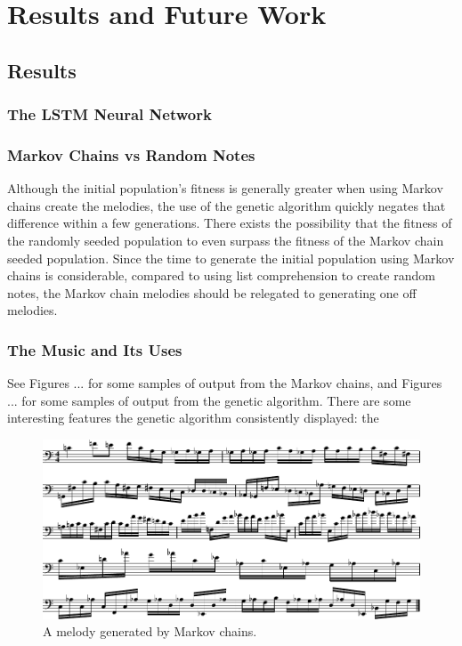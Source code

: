 \chapter{Results and Future Work} \label{results_future}

\section{Results} \label{results}

\subsection{The LSTM Neural Network}


\subsection{Markov Chains vs Random Notes}
Although the initial population's fitness is generally greater when using Markov chains create the melodies, the use of the genetic algorithm quickly negates that difference within a few generations.
There exists the possibility that the fitness of the randomly seeded population to even surpass the fitness of the Markov chain seeded population.
Since the time to generate the initial population using Markov chains is considerable, compared to using list comprehension to create random notes, the Markov chain melodies should be relegated to generating one off melodies.

\subsection{The Music and Its Uses}
See Figures ... for some samples of output from the Markov chains, and Figures ... for some samples of output from the genetic algorithm.
There are some interesting features the genetic algorithm consistently displayed: the 

\begin{figure}[h]
	\centering
	\includegraphics[width=\linewidth]{figures/markov_melody_1.pdf}
	\caption{A melody generated by Markov chains.}
	\label{fig:music:markov1}
\end{figure}

